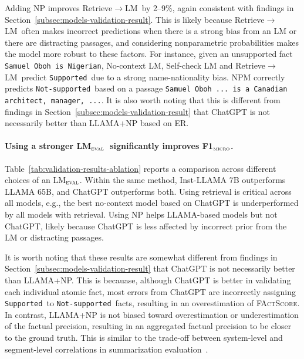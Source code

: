 \documentclass[11pt]{article}
\newcommand{\ours}{\textsc{FActScore}}
\newcommand{\evalLM}{LM$_\textsc{eval}$}
\newcommand{\sLabel}{\texttt{Supported}}
\newcommand{\nsLabel}{\texttt{Not-supported}}
\newcommand{\rtg}{Retrieve$\rightarrow$LM}
\newcommand{\Fone}{F1$_\textsc{micro}$}
\newcommand{\kalpesh}[1]{\textcolor{brown}{[Kalpesh: #1]}
}
\begin{document}
Adding NP improves \rtg\ by 2--9\%, again consistent with findings in Section~\ref{subsec:models-validation-result}. This is likely because \rtg\ often makes incorrect predictions when there is a strong bias from an LM or there are distracting passages, and considering nonparametric probabilities makes the model more robust to these factors. For instance, given an unsupported fact \texttt{Samuel Oboh is Nigerian}, No-context LM, Self-check LM and \rtg\ predict \sLabel\ due to a strong name-nationality bias.
NPM correctly predicts \nsLabel\ based on a passage \texttt{Samuel Oboh ... is a Canadian architect, manager, ...}.
It is also worth noting that this is different from findings in Section~\ref{subsec:models-validation-result} that ChatGPT is not necessarily better than LLAMA+NP  based on ER.


\paragraph{Using a stronger \evalLM\ significantly improves \Fone.}
Table~\ref{tab:validation-results-ablation} reports a comparison across different choices of an \evalLM{}. Within the same method, Inst-LLAMA 7B outperforms LLAMA 65B, and ChatGPT outperforms both.
Using retrieval is critical across all models, e.g., the best no-context model based on ChatGPT is underperformed by all models with retrieval.
Using NP helps LLAMA-based models but not ChatGPT, likely because ChatGPT is less affected by incorrect prior from the LM or distracting passages.

It is worth noting that these results are somewhat different from findings in Section~\ref{subsec:models-validation-result} that ChatGPT is not necessarily better than LLAMA+NP. This is becauase, although ChatGPT is better in validating each individual atomic fact, most errors from ChatGPT are incorrectly assigning \sLabel\ to \nsLabel\ facts, resulting in an overestimation of \ours.
In contrast, LLAMA+NP is not biased toward overestimation or underestimation of the factual precision, resulting in an aggregated factual precision to be closer to the ground truth.
This is similar to the trade-off between system-level and segment-level correlations in summarization evaluation~\citep{bhandari-etal-2020-evaluating,deutsch2021towards}.
\end{document}
